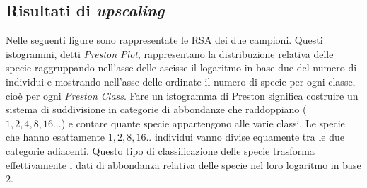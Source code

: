 \subsection{Risultati di \emph{upscaling}}
Nelle seguenti figure sono rappresentate le RSA dei due campioni. Questi istogrammi, detti \emph{Preston Plot}, rappresentano la distribuzione relativa delle specie raggruppando nell'asse delle ascisse il logaritmo in base due del numero di individui e mostrando nell'asse delle ordinate il numero di specie per ogni classe, cioè per ogni \emph{Preston Class}. Fare un istogramma di Preston significa costruire un sistema di suddivisione in categorie di abbondanze che raddoppiano ($1,2,4,8,16...$) e contare quante specie appartengono alle varie classi. Le specie che hanno esattamente $1,2,8,16..$ individui vanno divise equamente tra le due categorie adiacenti. Questo tipo di classificazione delle specie trasforma effettivamente i dati di abbondanza relativa delle specie nel loro logaritmo in base $2$.


